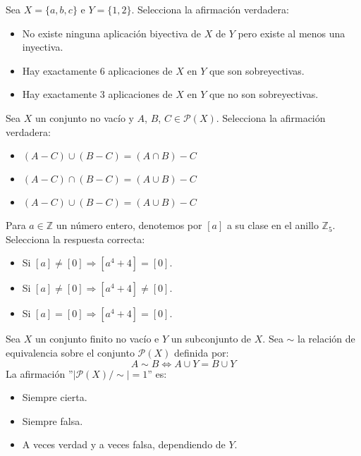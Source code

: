 \documentclass[12pt]{article}
\begin{document}
    \begin{ejercicio}
        Sea $X = \{a, b, c\}$ e $Y = \{1, 2\}$. Selecciona la afirmación verdadera:
        \begin{itemize}
            \item No existe ninguna aplicación biyectiva de $X$ de $Y$ pero existe al menos una inyectiva.
            \item Hay exactamente 6 aplicaciones de $X$ en $Y$ que son sobreyectivas.
            \item Hay exactamente 3 aplicaciones de $X$ en $Y$ que no son sobreyectivas.
        \end{itemize}
    \end{ejercicio}

    \begin{ejercicio}
        Sea $X$ un conjunto no vacío y $A$, $B$, $C \in \mathcal{P}(X)$. Selecciona la afirmación verdadera:
        \begin{itemize}
            \item $(A-C) \cup (B-C) = (A\cap B)-C$
            \item $(A-C) \cap (B-C) = (A\cup B)-C$
            \item $(A-C) \cup (B-C) = (A\cup B)-C$
        \end{itemize}
    \end{ejercicio}

    \begin{ejercicio}
        Para $a \in \mathbb{Z}$ un número entero, denotemos por $[a]$ a su clase en el anillo $\mathbb{Z}_5$. Selecciona la respuesta correcta:
        \begin{itemize}
            \item Si $[a] \neq [0] \Rightarrow [a^4+4] = [0]$.
            \item Si $[a] \neq [0] \Rightarrow [a^4+4] \neq [0]$.
            \item Si $[a] = [0] \Rightarrow [a^4+4] = [0]$.
        \end{itemize}
    \end{ejercicio}

    \begin{ejercicio}
        Sea $X$ un conjunto finito no vacío e $Y$ un subconjunto de $X$. Sea $\sim$ la relación de equivalencia sobre el conjunto $\mathcal{P}(X)$ definida por:
        $$A \sim B \Leftrightarrow A \cup Y = B \cup Y$$
        La afirmación ''$|\mathcal{P}(X)/\sim|=1$'' es:
        \begin{itemize}
            \item Siempre cierta.
            \item Siempre falsa.
            \item A veces verdad y a veces falsa, dependiendo de $Y$.
        \end{itemize}
    \end{ejercicio}
\end{document}
